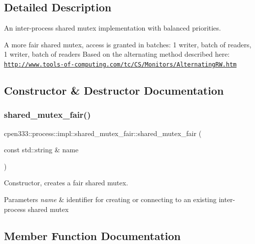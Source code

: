 \subsection{Detailed Description}
An inter-\/process shared mutex implementation with balanced priorities. 

A more fair shared mutex, access is granted in batches\+: 1 writer, batch of readers, 1 writer, batch of readers Based on the alternating method described here\+: \href{http://www.tools-of-computing.com/tc/CS/Monitors/AlternatingRW.htm}{\tt http\+://www.\+tools-\/of-\/computing.\+com/tc/\+C\+S/\+Monitors/\+Alternating\+R\+W.\+htm} 

\subsection{Constructor \& Destructor Documentation}
\mbox{\label{classcpen333_1_1process_1_1impl_1_1shared__mutex__fair_a4a46bce7595b9f2a29067723f3b72b5e}} 
\subsubsection{\texorpdfstring{shared\+\_\+mutex\+\_\+fair()}{shared\_mutex\_fair()}}
{\footnotesize\ttfamily cpen333\+::process\+::impl\+::shared\+\_\+mutex\+\_\+fair\+::shared\+\_\+mutex\+\_\+fair (\begin{DoxyParamCaption}\item[{const std\+::string \&}]{name }\end{DoxyParamCaption})\hspace{0.3cm}{\ttfamily [inline]}}



Constructor, creates a fair shared mutex. 


\begin{DoxyParams}{Parameters}
{\em name} & identifier for creating or connecting to an existing inter-\/process shared mutex \\
\hline
\end{DoxyParams}


\subsection{Member Function Documentation}
\mbox{\label{classcpen333_1_1process_1_1impl_1_1shared__mutex__fair_a85de84ee97bdf015411169a02935dc4d}} 

